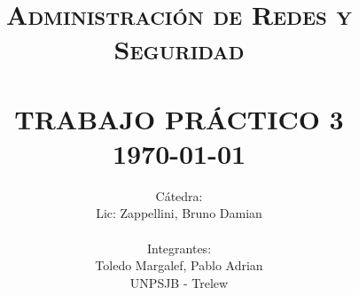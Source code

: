 \title{ \normalsize \textsc{Administración de Redes y Seguridad}
        \\ [2.0cm]
        \HRule{0.5pt} \\
        \LARGE \textbf{\uppercase{Trabajo Práctico 3}}
        \HRule{2pt} \\ [0.5cm]
        \normalsize \today \vspace*{5\baselineskip}}

\date{}

\author{
        Cátedra: \\
        Lic: Zappellini, Bruno Damian \\
\\
        Integrantes: \\
        Toledo Margalef, Pablo Adrian \\
        UNPSJB - Trelew}

\maketitle
